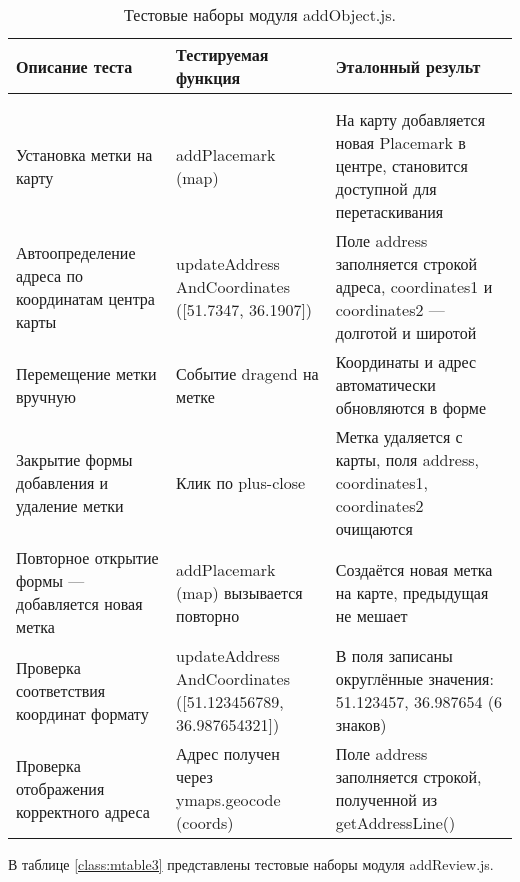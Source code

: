 \begin{xltabular}{\textwidth}{|X|p{4cm}|X|}
	\caption{Тестовые наборы модуля addObject.js.\label{class:mtable2}}\\
	\hline \centrow Описание теста & \centrow Тестируемая функция & \centrow Эталонный результ\\
	\hline {} &  & \\ \hline
	\endfirsthead
	 &  & \\ \hline
	\finishhead
	Установка метки на карту & addPlacemark (map) & На карту добавляется новая Placemark в центре, становится доступной для перетаскивания\\
	\hline Автоопределение адреса по координатам центра карты & updateAddress AndCoordinates ([51.7347, 36.1907]) & Поле address заполняется строкой адреса, coordinates1 и coordinates2 — долготой и широтой\\
	\hline Перемещение метки вручную & Событие dragend на метке & Координаты и адрес автоматически обновляются в форме\\
	\hline Закрытие формы добавления и удаление метки & Клик по plus-close & Метка удаляется с карты, поля address, coordinates1, coordinates2 очищаются\\
	\hline Повторное открытие формы — добавляется новая метка & addPlacemark (map) вызывается повторно & Создаётся новая метка на карте, предыдущая не мешает\\
	\hline Проверка соответствия координат формату & updateAddress AndCoordinates ([51.123456789, 36.987654321]) & В поля записаны округлённые значения: 51.123457, 36.987654 (6 знаков)\\
	\hline Проверка отображения корректного адреса & Адрес получен через ymaps.geocode (coords) & Поле address заполняется строкой, полученной из getAddressLine()\\
\end{xltabular}

В таблице \ref{class:mtable3} представлены тестовые наборы модуля addReview.js.


